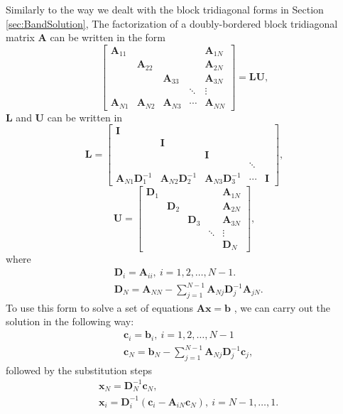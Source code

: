 \begin{alg}
  Similarly to the way we dealt with the block tridiagonal forms in
  Section \ref{sec:BandSolution}, The factorization of a
  doubly-bordered block tridiagonal matrix $\mathbf{A}$ can be written
    in the form
    $$
    \left[
      \begin{array}{ccccc}
        \mathbf{A}_{11} & & & & \mathbf{A}_{1N} \\
        & \mathbf{A}_{22} & & & \mathbf{A}_{2N}\\
               & & \mathbf{A}_{33} & & \mathbf{A}_{3N}\\
            &   & & \ddots & \vdots  \\
        \mathbf{A}_{N1}& \mathbf{A}_{N2}& \mathbf{A}_{N3}& \cdots & \mathbf{A}_{NN}
      \end{array}
    \right]=\mathbf{LU},
    $$
    $\mathbf{L}$ and $\mathbf{U}$ can be written in 
    $$
 \mathbf{L}=\left[
      \begin{array}{ccccc}
        \mathbf{I} & & & &  \\
        & \mathbf{I}& & & \\
               & & \mathbf{I}& & \\
               & & & \ddots&  \\
        \mathbf{A}_{N1}\mathbf{D}_1^{-1}& \mathbf{A}_{N2}\mathbf{D}_2^{-1}& \mathbf{A}_{N3}\mathbf{D}_3^{-1}& \cdots & \mathbf{I}
      \end{array}
    \right],
    $$
    $$
    \mathbf{U}=\left[
      \begin{array}{ccccc}
        \mathbf{D}_1 & & & & \mathbf{A}_{1N} \\
         & \mathbf{D}_2& & & \mathbf{A}_{2N}\\
               & & \mathbf{D}_3& & \mathbf{A}_{3N}\\
               & & & \ddots& \vdots \\
        & & & & \mathbf{D}_N
      \end{array}
    \right],
    $$
    where
  \begin{align}
    &\mathbf{D}_i=\mathbf{A}_{ii},\ i=1,2,\ldots,N-1.\\
    &\mathbf{D}_N= \mathbf{A}_{NN}-\sum\limits_{j=1}^{N-1}\mathbf{A}_{Nj}\mathbf{D}_{j}^{-1}\mathbf{A}_{jN}.
  \end{align}
  To use this form to solve a set of equations $\mathbf{Ax=b}$ , we can carry
  out the solution in the following way:
  \begin{align}
    &\mathbf{c}_i=\mathbf{b}_i,\ i=1,2,\ldots,N-1\\
    &\mathbf{c}_N=\mathbf{b}_N-\sum\limits_{j=1}^{N-1}\mathbf{A}_{Nj}\mathbf{D}^{-1}_{j}\mathbf{c}_{j},
  \end{align}
  followed by the substitution steps
  \begin{align}
   &\mathbf{x}_N=\mathbf{D}^{-1}_N\mathbf{c}_N,\\
   &\mathbf{x}_i=\mathbf{D}_i^{-1}(\mathbf{c}_i-\mathbf{A}_{iN}\mathbf{c}_{N}),\ i=N-1,\ldots,1.
  \end{align}
\end{alg}

